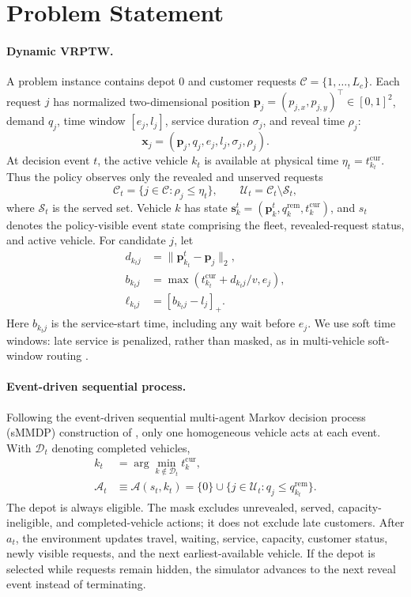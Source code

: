 \documentclass[letterpaper]{article}
\begin{document}
\section{Problem Statement}
\label{sec:prob}

\paragraph{Dynamic VRPTW.}
A problem instance contains depot $0$ and customer requests $\mathcal C=\{1,\ldots,L_c\}$. Each request $j$ has normalized two-dimensional position $\mathbf p_j=(p_{j,x},p_{j,y})^\top\in[0,1]^2$, demand $q_j$, time window $[e_j,l_j]$, service duration $\sigma_j$, and reveal time $\rho_j$:
\[
\mathbf x_j=(\mathbf p_j,q_j,e_j,l_j,\sigma_j,\rho_j).
\]
At decision event $t$, the active vehicle $k_t$ is available at physical time $\eta_t=t^{\mathrm{cur}}_{k_t}$. Thus the policy observes only the revealed and unserved requests
\[
\mathcal C_t=\{j\in\mathcal C:\rho_j\leq\eta_t\},\qquad
\mathcal U_t=\mathcal C_t\setminus\mathcal S_t,
\]
where $\mathcal S_t$ is the served set. Vehicle $k$ has state $\mathbf s_k^t=(\mathbf p_k^t,q_k^{\mathrm{rem}},t_k^{\mathrm{cur}})$, and $s_t$ denotes the policy-visible event state comprising the fleet, revealed-request status, and active vehicle. For candidate $j$, let
\[
\begin{aligned}
d_{k_tj}&=\|\mathbf p_{k_t}^t-\mathbf p_j\|_2,\\
b_{k_tj}&=\max\!\left(t_{k_t}^{\mathrm{cur}}+d_{k_tj}/v,e_j\right),\\
\ell_{k_tj}&=[b_{k_tj}-l_j]_+ .
\end{aligned}
\]
Here $b_{k_tj}$ is the service-start time, including any wait before $e_j$. We use soft time windows: late service is penalized, rather than masked, as in multi-vehicle soft-window routing \cite{zhang2020multi, bono2021mardam}.

\paragraph{Event-driven sequential process.}
Following the event-driven sequential multi-agent Markov decision process (sMMDP) construction of \citet{bono2021mardam}, only one homogeneous vehicle acts at each event. With $\mathcal D_t$ denoting completed vehicles,
\[
\begin{aligned}
k_t&=\arg\min_{k\notin\mathcal D_t}t_k^{\mathrm{cur}},\\
\mathcal A_t&\equiv\mathcal A(s_t,k_t)=\{0\}\cup
\{j\in\mathcal U_t:q_j\leq q_{k_t}^{\mathrm{rem}}\}.
\end{aligned}
\]
The depot is always eligible. The mask excludes unrevealed, served, capacity-ineligible, and completed-vehicle actions; it does not exclude late customers. After $a_t$, the environment updates travel, waiting, service, capacity, customer status, newly visible requests, and the next earliest-available vehicle. If the depot is selected while requests remain hidden, the simulator advances to the next reveal event instead of terminating.
\end{document}
